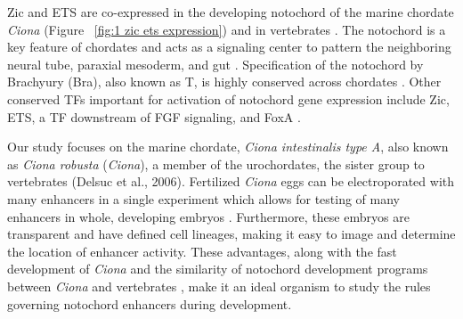 Zic and ETS are co-expressed in the developing notochord of the marine chordate \textit{Ciona} (Figure ~\ref{fig:1 zic ets expression}) and in vertebrates \cite{dykes2018,matsumoto2007a}. The notochord is a key feature of chordates and acts as a signaling center to pattern the neighboring neural tube, paraxial mesoderm, and gut \cite{herrmann1994,stemple2005}. Specification of the notochord by Brachyury (Bra), also known as T, is highly conserved across chordates \cite{chesley1935,chiba2009,wilkinson1990,yasuo1993}. Other conserved TFs important for activation of notochord gene expression include Zic, ETS, a TF downstream of FGF signaling, and FoxA \cite{ang1994,dal-pra2011,dykes2018,elms2004,imai2002,imai2002a,jose-edwards2015a,katikala2013,kumano2006,matsumoto2007a,matsumoto2007a,miya2003,passamaneck2009a,schulte-merker1995,warr2008,weinstein1994,yagi2004,yasuo2007}.

Our study focuses on the marine chordate, \textit{\textit{Ciona} intestinalis type A},  also known as \textit{\textit{Ciona} robusta} (\textit{Ciona}), a member of the urochordates, the sister group to vertebrates \cite{delsuc2006}(Delsuc et al., 2006). Fertilized \textit{Ciona} eggs can be electroporated with many enhancers in a single experiment which allows for testing of many enhancers in whole, developing embryos \cite{davidson2006,farley2015a}. Furthermore, these embryos are transparent and have defined cell lineages, making it easy to image and determine the location of enhancer activity. These advantages, along with the fast development of \textit{Ciona} and the similarity of notochord development programs between \textit{Ciona} and vertebrates \cite{davidson2006,digregorio2020}, make it an ideal organism to study the rules governing notochord enhancers during development. 

